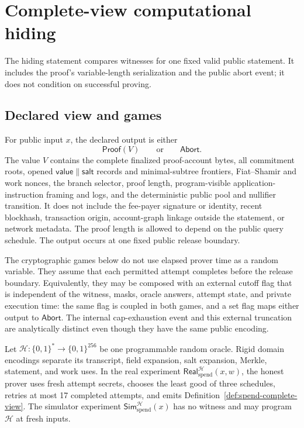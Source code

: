 \section{Complete-view computational hiding}
\label{sec:hiding}

The hiding statement compares witnesses for one fixed valid public statement.
It includes the proof's variable-length serialization and the public abort
event; it does not condition on successful proving.

\subsection{Declared view and games}

\begin{definition}
\label{def:spend-complete-view}
For public input \(x\), the declared output is either
\[
 \mathsf{Proof}(V)\qquad\text{or}\qquad \mathsf{Abort}.
\]
The value \(V\) contains the complete finalized proof-account bytes, all
commitment roots, opened \(\mathsf{value}\|\mathsf{salt}\) records and
minimal-subtree frontiers, Fiat--Shamir and work nonces, the branch selector,
proof length, program-visible application-instruction framing and logs, and
the deterministic public pool and nullifier transition.  It does not include
the fee-payer signature or identity, recent blockhash, transaction origin,
account-graph linkage outside the statement, or network metadata.  The proof
length is allowed to depend on the public query schedule.  The output occurs
at one fixed public release boundary.
\end{definition}

The cryptographic games below do not use elapsed prover time as a random
variable.  They assume that each permitted attempt completes before the
release boundary.  Equivalently, they may be composed with an external cutoff
flag that is independent of the witness, masks, oracle answers, attempt state,
and private execution time: the same flag is coupled in both games, and a set
flag maps either output to \(\mathsf{Abort}\).  The internal cap-exhaustion
event and this external truncation are analytically distinct even though they
have the same public encoding.

Let \(\mathcal H:\{0,1\}^*\rightarrow\{0,1\}^{256}\) be one programmable
random oracle.  Rigid domain encodings separate its transcript, field
expansion, salt expansion, Merkle, statement, and work uses.  In the real
experiment \(\mathsf{Real}_{\mathrm{spend}}^{\mathcal H}(x,w)\), the honest prover uses
fresh attempt secrets, chooses the least good of three schedules, retries at
most 17 completed attempts, and emits
Definition~\ref{def:spend-complete-view}.  The
simulator experiment \(\mathsf{Sim}_{\mathrm{spend}}^{\mathcal H}(x)\) has no witness and
may program \(\mathcal H\) at fresh inputs.


